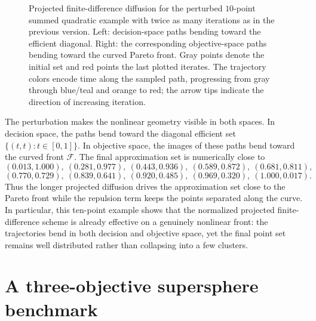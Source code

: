 \documentclass{article}
\begin{document}
\begin{figure}[t]
\begin{minipage}{0.48\textwidth}
\end{minipage}
\caption{Projected finite-difference diffusion for the perturbed $10$-point summed quadratic example with twice as many iterations as in the previous version. Left: decision-space paths bending toward the efficient diagonal. Right: the corresponding objective-space paths bending toward the curved Pareto front. Gray points denote the initial set and red points the last plotted iterates. The trajectory colors encode time along the sampled path, progressing from gray through blue/teal and orange to red; the arrow tips indicate the direction of increasing iteration.}
\label{fig:quadratic-ten-point-both}
\end{figure}

The perturbation makes the nonlinear geometry visible in both spaces. In decision space, the paths bend toward the diagonal efficient set $\{(t,t):t\in[0,1]\}$. In objective space, the images of these paths bend toward the curved front $\mathcal F$. The final approximation set is numerically close to
\[
(0.013,1.000),\ (0.281,0.977),\ (0.443,0.936),\ (0.589,0.872),\ (0.681,0.811),
\]
\[
(0.770,0.729),\ (0.839,0.641),\ (0.920,0.485),\ (0.969,0.320),\ (1.000,0.017).
\]
Thus the longer projected diffusion drives the approximation set close to the Pareto front while the repulsion term keeps the points separated along the curve. In particular, this ten-point example shows that the normalized projected finite-difference scheme is already effective on a genuinely nonlinear front: the trajectories bend in both decision and objective space, yet the final point set remains well distributed rather than collapsing into a few clusters.



\section{A three-objective supersphere benchmark}
\label{sec:three-objective-supersphere}
\end{document}
